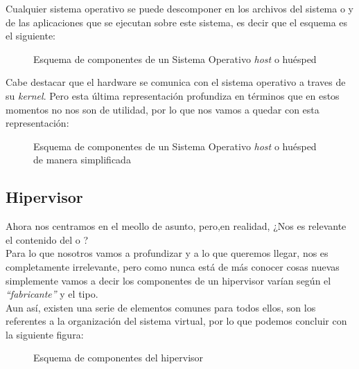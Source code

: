 Cualquier sistema operativo se puede descomponer en los archivos del sistema o \emph{} y de las aplicaciones que se ejecutan sobre este sistema, es decir que el esquema es el siguiente:

\begin{figure}[H]
\begin{center}
\end{center}
\caption[Sistema Operativo huésped]{Esquema de componentes de un Sistema Operativo \emph{host} o huésped}
\end{figure}

Cabe destacar que el hardware se comunica con el sistema operativo a traves de su \emph{kernel}. Pero esta última representación profundiza en términos que en estos momentos no nos son de utilidad, por lo que nos vamos a quedar con esta representación:

\begin{figure}[H]
\begin{center}
\end{center}
\caption[Sistema Operativo huésped simplificado]{Esquema de componentes de un Sistema Operativo \emph{host} o huésped de manera simplificada}
\end{figure}

\subsection{Hipervisor}
Ahora nos centramos en el meollo de asunto, pero,en realidad, ¿Nos es relevante el contenido del  o ?\\

Para lo que nosotros vamos a profundizar y a lo que queremos llegar, nos es completamente irrelevante, pero como nunca está de más conocer cosas nuevas simplemente vamos a decir los componentes de un hipervisor varían según el \emph{\textquotedblleft fabricante\textquotedblright} y el tipo.\\

Aun así, existen una serie de elementos comunes para todos ellos, son los referentes a la organización del sistema virtual, por lo que podemos concluir con la siguiente figura:

\begin{figure}[H]
\begin{center}
\end{center}
\caption[Componentes hipervisor]{Esquema de componentes del hipervisor}
\end{figure}

